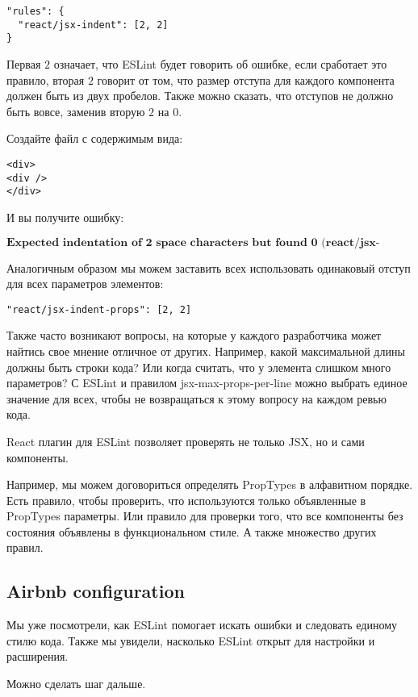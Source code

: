 \begin{lstlisting}
"rules": {
  "react/jsx-indent": [2, 2]
}
\end{lstlisting}

Первая $2$ означает, что ESLint будет говорить об ошибке, если сработает это правило, вторая $2$ говорит от том, что размер отступа для каждого компонента должен быть из двух пробелов. Также можно сказать, что отступов не должно быть вовсе, заменив вторую $2$ на $0$.

Создайте файл с содержимым вида:

\begin{lstlisting}
<div>
<div />
</div>
\end{lstlisting}

И вы получите ошибку:

$$
\textbf{Expected indentation of 2 space characters but found 0 (react/jsx-indent)}
$$

Аналогичным образом мы можем заставить всех использовать одинаковый отступ для всех параметров элементов:

\begin{lstlisting}
"react/jsx-indent-props": [2, 2]
\end{lstlisting}

Также часто возникают вопросы, на которые у каждого разработчика может найтись свое мнение отличное от других. Например, какой максимальной длины должны быть строки кода? Или когда считать, что у элемента слишком много параметров? С ESLint и правилом jsx-max-props-per-line можно выбрать единое значение для всех, чтобы не возвращаться к этому вопросу на каждом ревью кода.

React плагин для ESLint позволяет проверять не только JSX, но и сами компоненты. 

Например, мы можем договориться определять PropTypes в алфавитном порядке. Есть правило, чтобы проверить, что используются только объявленные в PropTypes параметры. Или правило для проверки того, что все компоненты без состояния объявлены в функциональном стиле. А также множество других правил.

\subsection*{Airbnb configuration}

Мы уже посмотрели, как ESLint помогает искать ошибки и следовать единому стилю кода. Также мы увидели, насколько ESLint открыт для настройки и расширения.

Можно сделать шаг дальше.

